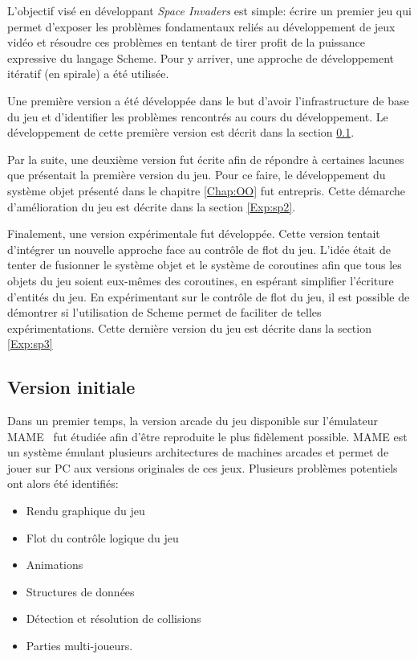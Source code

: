 \documentclass[12pt,twoside,letterpaper,francais]{book}
\begin{document}
L'objectif visé en développant \textit{Space Invaders} est simple: écrire un premier jeu
qui permet d'exposer les problèmes fondamentaux reliés au
dévelop\-pement de jeux vidéo et résoudre ces problèmes en tentant de
tirer profit de la puissance expressive du langage Scheme. Pour y
arriver, une approche de dévelop\-pement itératif (en spirale) a été
utilisée.

Une première version a été développée dans le but d'avoir
l'infrastructure de base du jeu et d'identifier les problèmes
rencontrés au cours du dévelop\-pement. Le dévelop\-pement de cette
première version est décrit dans la section \ref{Exp:sp1}.

Par la suite, une deuxième version fut écrite afin de répondre à
certaines lacunes que présentait la première version du jeu. Pour ce
faire, le dévelop\-pement du système objet présenté dans le chapitre
\ref{Chap:OO} fut entrepris. Cette démarche d'amélioration du jeu est
décrite dans la section \ref{Exp:sp2}.

Finalement, une version expérimentale fut développée. Cette version
tentait d'intégrer un nouvelle approche face au contrôle de flot du
jeu. L'idée était de tenter de fusionner le système objet et le
système de coroutines afin que tous les objets du jeu soient eux-mêmes
des coroutines, en espérant simplifier l'écriture d'entités du jeu. En
expérimentant sur le contrôle de flot du jeu, il est possible de
démontrer si l'utilisation de Scheme permet de faciliter de
telles expérimentations. Cette dernière version du jeu est décrite
dans la section \ref{Exp:sp3}


\FloatBarrier
\subsection{Version initiale} \label{Exp:sp1}
Dans un premier temps, la version arcade du jeu disponible sur
l'émulateur MAME~\cite{MAME} fut étudiée afin d'être reproduite le
plus fidèlement possible. MAME est un système émulant plusieurs
architectures de machines arcades et permet de jouer sur PC aux
versions originales de ces jeux. Plusieurs problèmes potentiels ont
alors été identifiés:

\begin{itemize}
\item Rendu graphique du jeu
\item Flot du contrôle logique du jeu
\item Animations
\item Structures de données
\item Détection et résolution de collisions
\item Parties multi-joueurs.
\end{itemize}
\end{document}

